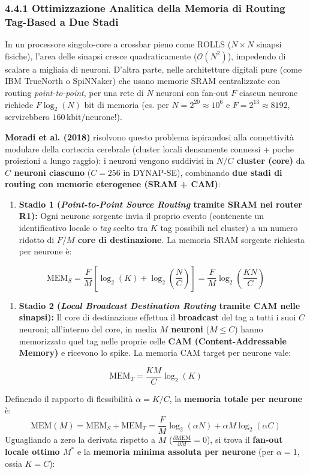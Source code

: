 \documentclass[11pt,a4paper]{article}
\begin{document}
\subsubsection{4.4.1 Ottimizzazione Analitica della Memoria di Routing Tag-Based a Due Stadi}
In un processore singolo-core a crossbar pieno come ROLLS ($N \times N$ sinapsi fisiche), l'area delle sinapsi cresce quadraticamente ($\mathcal{O}(N^2)$), impedendo di scalare a migliaia di neuroni. D'altra parte, nelle architetture digitali pure (come IBM TrueNorth o SpiNNaker) che usano memorie SRAM centralizzate con routing \textit{point-to-point}, per una rete di $N$ neuroni con fan-out $F$ ciascun neurone richiede $F \log_2(N)$ bit di memoria (es. per $N = 2^{20} \approx 10^6$ e $F = 2^{13} \approx 8192$, servirebbero \textbf{$160\,\text{kbit/neurone}$}!).

\textbf{Moradi et al. (2018)} risolvono questo problema ispirandosi alla connettività modulare della corteccia cerebrale (cluster locali densamente connessi + poche proiezioni a lungo raggio): i neuroni vengono suddivisi in \textbf{$N/C$ cluster (core)} da \textbf{$C$ neuroni ciascuno} ($C = 256$ in DYNAP-SE), combinando \textbf{due stadi di routing con memorie eterogenee (SRAM + CAM)}:
\begin{enumerate}
  \item \textbf{Stadio 1 (\textit{Point-to-Point Source Routing} tramite SRAM nei router R1):} Ogni neurone sorgente invia il proprio evento (contenente un identificativo locale o \textit{tag} scelto tra $K$ tag possibili nel cluster) a un numero ridotto di \textbf{$F/M$ core di destinazione}. La memoria SRAM sorgente richiesta per neurone è:
\end{enumerate}
\[
\text{MEM}_S = \frac{F}{M} \left[\log_2(K) + \log_2\!\left(\frac{N}{C}\right)\right] = \frac{F}{M} \log_2\!\left(\frac{KN}{C}\right)
\]
\begin{enumerate}
  \item \textbf{Stadio 2 (\textit{Local Broadcast Destination Routing} tramite CAM nelle sinapsi):} Il core di destinazione effettua il \textbf{broadcast} del tag a tutti i suoi $C$ neuroni; all'interno del core, in media \textbf{$M$ neuroni} ($M \le C$) hanno memorizzato quel tag nelle proprie celle \textbf{CAM (Content-Addressable Memory)} e ricevono lo spike. La memoria CAM target per neurone vale:
\end{enumerate}
\[
\text{MEM}_T = \frac{KM}{C} \log_2(K)
\]

Definendo il rapporto di flessibilità $\alpha = K/C$, la \textbf{memoria totale per neurone} è:
\[
\text{MEM}(M) = \text{MEM}_S + \text{MEM}_T = \frac{F}{M} \log_2(\alpha N) + \alpha M \log_2(\alpha C)
\]
Uguagliando a zero la derivata rispetto a $M$ ($\frac{\partial \text{MEM}}{\partial M} = 0$), si trova il \textbf{fan-out locale ottimo $M^*$} e la \textbf{memoria minima assoluta per neurone} (per $\alpha = 1$, ossia $K = C$):
\end{document}
